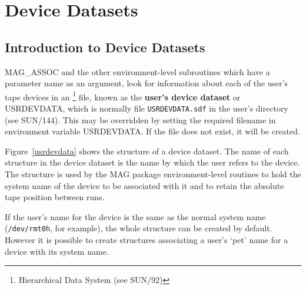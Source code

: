 \documentclass[11pt]{starlink}
\begin{document}
\section{\label{device_datasets}Device Datasets}
\subsection{\label{dataset_intro}Introduction to Device Datasets}
MAG\_ASSOC and the other environment-level subroutines which have a
parameter name as an argument, look for information about each of the user's
tape devices in an
\footnote{Hierarchical Data System
(see SUN/92)} file, known as the \textbf{user's device dataset} or USRDEVDATA,
which is normally file \texttt{USRDEVDATA.sdf} in the user's
directory (see SUN/144).
This may be overridden by setting the required filename in environment
variable USRDEVDATA. If the file does not exist, it will be created.

Figure~\ref{usrdevdata} shows the structure of a device dataset.
The name of each structure in the device dataset is the name by which the user
refers to the device.
The structure is used by the MAG package environment-level routines to hold the
system name of the device to be associated with it and to retain the absolute
tape position between runs.

If the user's name for the device is the same as the normal system name
(\texttt{/dev/rmt0h}, for example), the whole structure can be created by default.
However it is possible to create structures associating a user's `pet' name
for a device with its system name.
\end{document}

